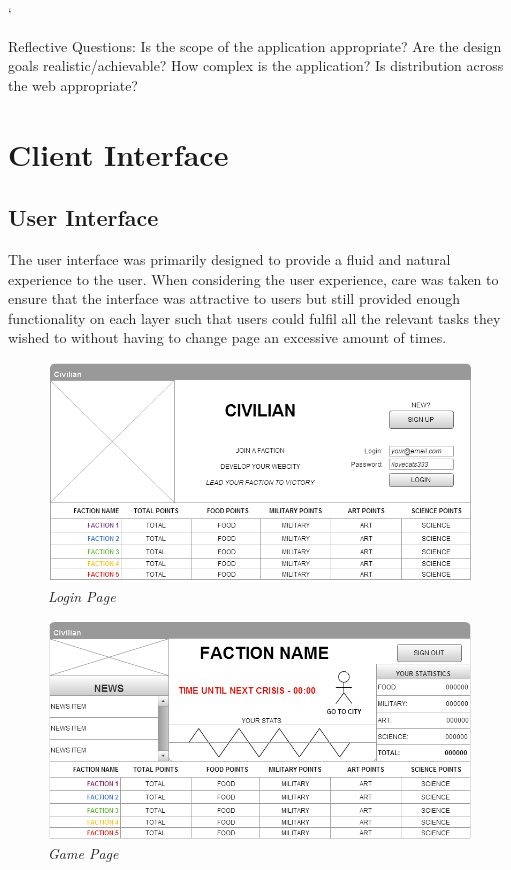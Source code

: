 `\documentclass{sig-alt-release2}
\begin{document}
Reflective Questions: 
Is the scope of the application appropriate? 
Are the design goals realistic/achievable? 
How complex is the application? 
Is distribution across the web appropriate? 

\section{Client Interface}

\subsection{User Interface}

The user interface was primarily designed to provide a fluid and natural experience to the user. When considering the user experience, care was taken to ensure that the interface was attractive to users but still provided enough functionality on each layer such that users could fulfil all the relevant tasks they wished to without having to change page an excessive amount of times. \\

\begin{figure}[!htbp]
  \caption{\textit{Login Page}}
  \begin{center}
		\includegraphics[scale=0.25]{img/w3.png}
  \end{center}
\end{figure}

\begin{figure}[!htbp]
  \caption{\textit{Game Page}}
  \begin{center}
		\includegraphics[scale=0.25]{img/w4.png}
  \end{center}
\end{figure}
\end{document}
